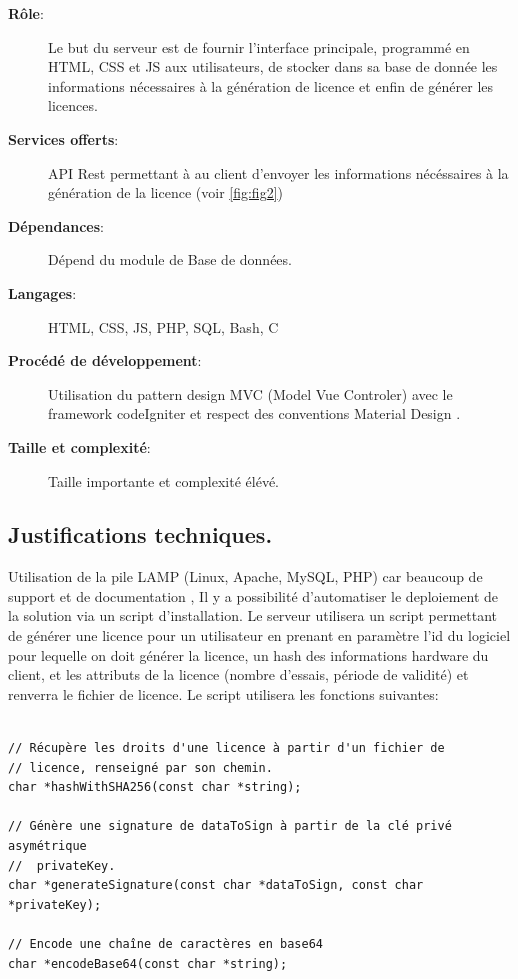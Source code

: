 \begin{description}
	\item[\textbf{Rôle}:]
				Le but du serveur est de fournir l'interface principale, programmé 
				en HTML, CSS et JS aux utilisateurs, de stocker dans sa base de donnée
				les informations nécessaires à la génération de licence et enfin de générer 
				les licences.
	\item[\textbf{Services offerts}:]
				API Rest \cite{REST} permettant à au client d'envoyer les informations
				nécéssaires à la génération de la licence (voir \ref{fig:fig2})				
	\item[\textbf{Dépendances}:]
				Dépend du module de Base de données.
	\item[\textbf{Langages}:]
				HTML, CSS, JS, PHP, SQL, Bash, C 
	\item[\textbf{Procédé de développement}:]
				Utilisation du pattern design MVC (Model Vue Controler) avec le framework codeIgniter et respect des
                conventions Material Design \cite{Material}.

	\item[\textbf{Taille et complexité}:]
				Taille importante et complexité élévé.
\end{description}

\subsection{Justifications techniques.}
Utilisation de la pile LAMP (Linux, Apache, MySQL, PHP) car beaucoup de 
support et de documentation \cite{LAMP}, Il y a possibilité d'automatiser 
le deploiement de la solution via un script d'installation. \newline
Le serveur utilisera un script permettant de générer une licence pour un 
utilisateur en prenant en paramètre l'id du logiciel pour lequelle on doit 
générer la licence, un hash des informations hardware du client, et les
attributs de la licence (nombre d'essais, période de validité) et renverra
le fichier de licence. Le script utilisera les fonctions suivantes:
\begin{verbatim}

// Récupère les droits d'une licence à partir d'un fichier de
// licence, renseigné par son chemin.
char *hashWithSHA256(const char *string);

// Génère une signature de dataToSign à partir de la clé privé asymétrique 
//  privateKey. 
char *generateSignature(const char *dataToSign, const char *privateKey);
  
// Encode une chaîne de caractères en base64
char *encodeBase64(const char *string);

\end{verbatim}

